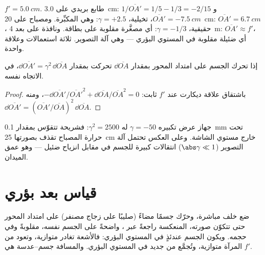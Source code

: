 \begin{example}\label{ex:b1:mirrors-thin-lenses:lensuses}
 $f' = \qty{5.0}{cm}$. طابع بريدي على \qty{3.0}{cm}:
$1/\overline{OA'} = 1/5 - 1/3 = -2/15$ و $\overline{OA'} = \qty{-7.5}{cm}$،
تخيلية، $\gamma = +2.5$: وهي المكبِّرة. ومصباح على \qty{20}{cm}:
$\overline{OA'} = \qty{6.7}{cm}$، حقيقية، $\gamma = -1/3$: أي 
مصغَّرة مقلوبة على بطاقة. ونافذة على بعد \qty{4}{m}: $\overline{OA'}
\approx f'$، أي  ضئيلة مقلوبة في المستوي البؤري --- وهي آلة التصوير.
ثلاثة استعمالات وعلاقة واحدة.
\end{example}

\begin{proposition}\label{prop:b1:mirrors-thin-lenses:longitudinal}
إذا تحرك الجسم على امتداد المحور بمقدار $\dd\overline{OA}$ تحركت
 بمقدار $\dd\overline{OA'} = \gamma^2\,\dd\overline{OA}$، في
الاتجاه نفسه.
\end{proposition}

\begin{proof}
باشتقاق علاقة ديكارت عند $f'$ ثابت:
$-\dd\overline{OA'}/\overline{OA'}^2 + \dd\overline{OA}/\overline{OA}^2 = 0$،
ومنه $\dd\overline{OA'} = (\overline{OA'}/\overline{OA})^2\,\dd\overline{OA}$.
\end{proof}

\begin{remark}\label{rem:b1:mirrors-thin-lenses:depth}
جهاز عرض تكبيره $\gamma = -50$ له $\gamma^2 = 2500$: فشريحة تتقوّس
بمقدار \qty{0.1}{mm} تحت حرارة المصباح تقذف بصورتها
\qty{25}{cm} خارج مستوي الشاشة. وعلى العكس تحتمل آلة التصوير ($\abs\gamma
\ll 1$) انتقالات كبيرة للجسم في مقابل انزياح ضئيل  ---
وهو عمق الميدان.
\end{remark}

\section{قياس بعد بؤري}

\begin{method}\label{met:b1:mirrors-thin-lenses:autocollimation}
ضع  خلف  مباشرة، وحرّك جسمًا مضاءً (صليبًا على زجاج
مصنفر) على امتداد المحور حتى تتكوّن صورته، المنعكسة راجعةً عبر ،
واضحةً على الجسم نفسه، مقلوبةً وفي حجمه. ويكون الجسم عندئذٍ في المستوي
البؤري: فالأشعة تغادر  متوازية، وتعود من المرآة متوازية،
وتُجمَّع من جديد في المستوي البؤري. والمسافة جسم--عدسة هي $f'$.
\end{method}

